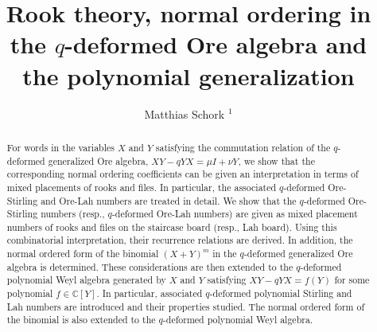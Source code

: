 \documentclass[10pt]{amsart}
\begin{document}
\title[Rook thery and normal ordering in the $q$-deformed Ore algebra]{Rook theory, normal ordering in the $q$-deformed Ore algebra and the polynomial generalization}
\author[M. Schork]{Matthias Schork $^{1}$}
\address{$^1$ Institute for Mathematics, Würzburg University, Emil-Fischer Str. 40, 97074 Würzburg, Germany, matthias.schork@mathematik.uni-wuerzburg.de}

\begin{abstract}
For words in the variables $X$ and $Y$ satisfying the commutation relation of the $q$-deformed generalized Ore algebra, $XY-qYX= \mu I + \nu Y$, we show that the corresponding normal ordering coefficients can be given an interpretation in terms of mixed placements of rooks and files. In particular, the associated $q$-deformed Ore-Stirling and Ore-Lah numbers are treated in detail. We show that the $q$-deformed Ore-Stirling numbers (resp., $q$-deformed Ore-Lah numbers) are given as mixed placement numbers of rooks and files on the staircase board (resp., Lah board). Using this combinatorial interpretation, their recurrence relations are derived. In addition, the normal ordered form of the binomial $(X+Y)^m$ in the $q$-deformed generalized Ore algebra is determined. These considerations are then extended to the $q$-deformed polynomial Weyl algebra generated by $X$ and $Y$ satisfying $XY-qYX=f(Y)$ for some polynomial $f\in \mathbb{C}[Y]$. In particular, associated $q$-deformed polynomial Stirling and Lah numbers are introduced and their properties studied. The normal ordered form of the binomial is also extended to the $q$-deformed polynomial Weyl algebra.

\end{abstract}
\maketitle
\end{document}

